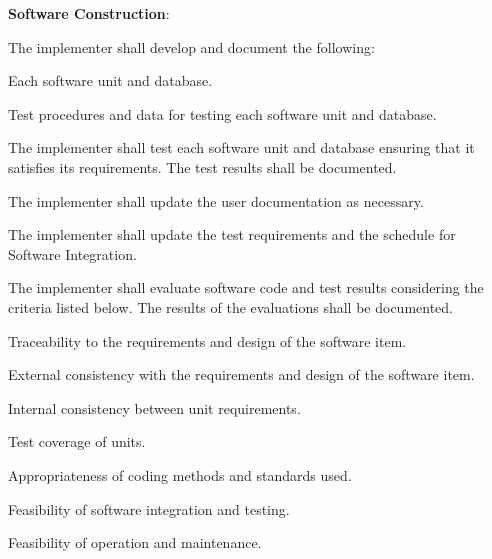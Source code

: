 			\begin{adjustwidth}{2em}{0pt} 

				\begin{compactenum}

					\item {\bf Software Construction}:

					\begin{compactenum}

						\item The implementer shall develop and document the following:

						\item Each software unit and database.

						\item Test procedures and data for testing each software unit and database.

						\item The implementer shall test each software unit and database ensuring that it satisfies its requirements. The test results shall be documented.

						\item The implementer shall update the user documentation as necessary.

						\item The implementer shall update the test requirements and the schedule for Software Integration.

						\item The implementer shall evaluate software code and test results considering the criteria listed below. The results of the evaluations shall be documented.

						\begin{compactenum}

							\item Traceability to the requirements and design of the software item.

							\item External consistency with the requirements and design of the software item.

							\item Internal consistency between unit requirements.

							\item Test coverage of units.

							\item Appropriateness of coding methods and standards used.

							\item Feasibility of software integration and testing.

							\item Feasibility of operation and maintenance.

						\end{compactenum}

					\end{compactenum}

				\end{compactenum}

			\end{adjustwidth}


